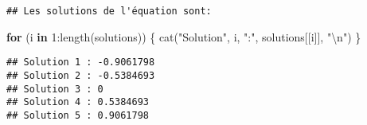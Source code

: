 \documentclass[
]{article}
\newenvironment{Shaded}{\begin{snugshade}}{\end{snugshade}}
\newcommand{\ControlFlowTok}[1]{\textcolor[rgb]{0.13,0.29,0.53}{\textbf{#1}}}
\newcommand{\DecValTok}[1]{\textcolor[rgb]{0.00,0.00,0.81}{#1}}
\newcommand{\FunctionTok}[1]{\textcolor[rgb]{0.00,0.00,0.00}{#1}}
\newcommand{\NormalTok}[1]{#1}
\newcommand{\SpecialCharTok}[1]{\textcolor[rgb]{0.00,0.00,0.00}{#1}}
\newcommand{\StringTok}[1]{\textcolor[rgb]{0.31,0.60,0.02}{#1}}
\begin{document}
\begin{verbatim}
## Les solutions de l'équation sont:
\end{verbatim}

\begin{Shaded}
\begin{Highlighting}[]
\ControlFlowTok{for}\NormalTok{ (i }\ControlFlowTok{in} \DecValTok{1}\SpecialCharTok{:}\FunctionTok{length}\NormalTok{(solutions)) \{}
  \FunctionTok{cat}\NormalTok{(}\StringTok{"Solution"}\NormalTok{, i, }\StringTok{":"}\NormalTok{, solutions[[i]], }\StringTok{"}\SpecialCharTok{\textbackslash{}n}\StringTok{"}\NormalTok{)}
\NormalTok{\}}
\end{Highlighting}
\end{Shaded}

\begin{verbatim}
## Solution 1 : -0.9061798 
## Solution 2 : -0.5384693 
## Solution 3 : 0 
## Solution 4 : 0.5384693 
## Solution 5 : 0.9061798
\end{verbatim}
\end{document}
